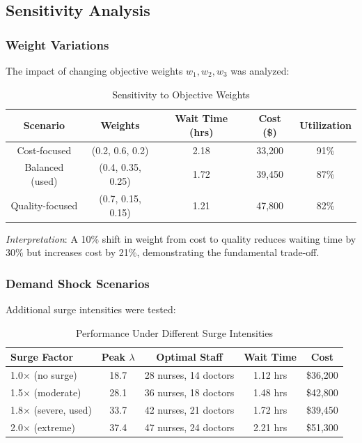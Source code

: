 \documentclass[12pt,a4paper]{article}
\begin{document}
	\subsection{Sensitivity Analysis}
	
	\subsubsection{Weight Variations}
	
	The impact of changing objective weights $w_1, w_2, w_3$ was analyzed:
	
	\begin{table}[h]
		\centering
		\caption{Sensitivity to Objective Weights}
		\begin{tabular}{@{}ccccc@{}}
			\toprule
			\textbf{Scenario} & \textbf{Weights} & \textbf{Wait Time (hrs)} & \textbf{Cost (\$)} & \textbf{Utilization} \\ \midrule
			Cost-focused & (0.2, 0.6, 0.2) & 2.18 & 33,200 & 91\% \\
			Balanced (used) & (0.4, 0.35, 0.25) & 1.72 & 39,450 & 87\% \\
			Quality-focused & (0.7, 0.15, 0.15) & 1.21 & 47,800 & 82\% \\ \bottomrule
		\end{tabular}
	\end{table}
	
	\textit{Interpretation}: A 10\% shift in weight from cost to quality reduces waiting time by 30\% but increases cost by 21\%, demonstrating the fundamental trade-off.
	
	\subsubsection{Demand Shock Scenarios}
	
	Additional surge intensities were tested:
	
	\begin{table}[h]
		\centering
		\caption{Performance Under Different Surge Intensities}
		\begin{tabular}{@{}lcccc@{}}
			\toprule
			\textbf{Surge Factor} & \textbf{Peak $\lambda$} & \textbf{Optimal Staff} & \textbf{Wait Time} & \textbf{Cost} \\ \midrule
			1.0× (no surge) & 18.7 & 28 nurses, 14 doctors & 1.12 hrs & \$36,200 \\
			1.5× (moderate) & 28.1 & 36 nurses, 18 doctors & 1.48 hrs & \$42,800 \\
			1.8× (severe, used) & 33.7 & 42 nurses, 21 doctors & 1.72 hrs & \$39,450 \\
			2.0× (extreme) & 37.4 & 47 nurses, 24 doctors & 2.21 hrs & \$51,300 \\ \bottomrule
		\end{tabular}
	\end{table}
	
\end{document}
